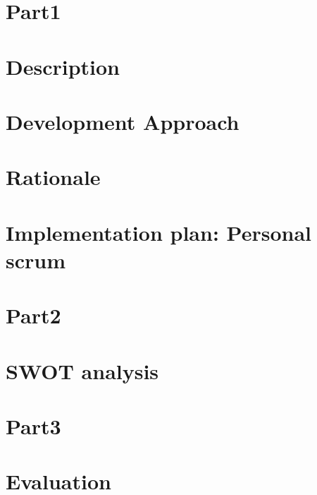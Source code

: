 


 
  \section*{Part1}
  \section*{Description}
  
  \section*{Development Approach}
  
  \section*{Rationale}
  
  \section*{Implementation plan: Personal scrum}
  


  \section*{Part2}
  \section*{SWOT analysis}
  
  

  \section*{Part3}
  \section*{Evaluation}
  
  

